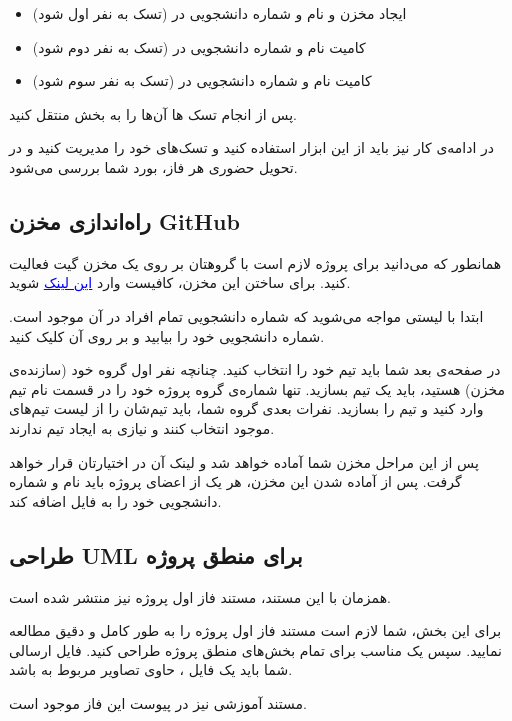 \documentclass[]{article}
\begin{document}
\begin{itemize}

\item
ایجاد مخزن  و  نام و شماره دانشجویی در  (تسک به نفر اول  شود)

\item
کامیت نام و شماره دانشجویی در  (تسک به نفر دوم  شود)

\item
کامیت نام و شماره دانشجویی در  (تسک به نفر سوم  شود)

\end{itemize}

پس از انجام تسک ها آن‌ها را به بخش  منتقل کنید.

در ادامه‌ی کار نیز باید از این ابزار استفاده کنید ‌و تسک‌های خود را مدیریت کنید و در تحویل حضوری هر فاز، بورد شما بررسی می‌شود.


\newpage
\subsection*{{\titr راه‌اندازی مخزن GitHub}}
\label{subsec:github}

همانطور که می‌دانید برای پروژه لازم است با گروهتان بر روی یک مخزن  گیت فعالیت کنید. برای ساختن این مخزن، کافیست وارد
 \href{https://classroom.github.com/g/5Uo3x-M4}{\textcolor{blue}{\underline{این لینک}}} 
 شوید.

ابتدا با لیستی مواجه می‌شوید که شماره دانشجویی تمام افراد در آن موجود است. شماره دانشجویی خود را بیابید و بر روی آن کلیک کنید.

در صفحه‌ی بعد شما باید تیم خود را انتخاب کنید. چنانچه نفر اول گروه خود (سازنده‌ی مخزن) هستید، باید یک تیم بسازید. تنها شماره‌ی گروه پروژه خود را در قسمت نام تیم وارد کنید و تیم را بسازید. نفرات بعدی گروه شما، باید تیم‌شان را از لیست تیم‌های موجود انتخاب کنند و نیازی به ایجاد تیم ندارند.

پس از این مراحل مخزن شما آماده خواهد شد و لینک آن در اختیارتان قرار خواهد گرفت. پس از آماده شدن این مخزن، هر یک از اعضای پروژه باید نام و شماره دانشجویی خود را به فایل  اضافه کند.

\newpage
\subsection*{{\titr طراحی UML برای منطق پروژه}}
\label{subsec:uml}

همزمان با این مستند، مستند فاز اول پروژه نیز منتشر شده است.

برای این بخش، شما لازم است مستند فاز اول پروژه را به طور کامل و دقیق مطالعه نمایید. سپس یک  مناسب برای تمام بخش‌های منطق پروژه طراحی کنید. فایل ارسالی شما باید یک فایل ، حاوی تصاویر مربوط به  باشد.

مستند آموزشی  نیز در پیوست این فاز موجود است.
\end{document}
